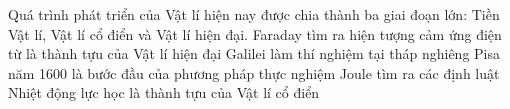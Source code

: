 \begin{ex}%
Quá trình phát triển của Vật lí hiện nay được chia thành ba giai đoạn lớn: Tiền Vật lí, Vật lí cổ điển và Vật lí hiện đại.
{Faraday tìm ra hiện tượng cảm ứng điện từ là thành tựu của Vật lí hiện đại} 
{\True Galilei làm thí nghiệm tại tháp nghiêng Pisa năm 1600 là bước đầu của phương pháp thực nghiệm} 
{\True Joule tìm ra các định luật Nhiệt động lực học là thành tựu của Vật lí cổ điển} 
\loigiai{ 
\begin{itemchoice}
\itemch
\itemch
\itemch
\itemch
\end{itemchoice}
}
\end{ex}
